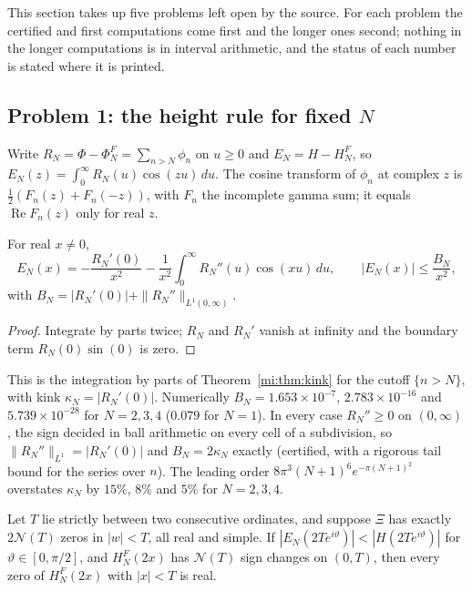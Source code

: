 This section takes up five problems left open by the source. For each problem the certified and first computations come first and the longer ones second; nothing in the longer computations is in interval arithmetic, and the status of each number is stated where it is printed.

\subsection{Problem 1: the height rule for fixed \texorpdfstring{$N$}{N}}

Write $R_N=\Phi-\Phi^F_N=\sum_{n>N}\phi_n$ on $u\ge0$ and $E_N=H-H^F_N$, so $E_N(z)=\int_0^\infty R_N(u)\cos(zu)\,du$. The cosine transform of $\phi_n$ at complex $z$ is $\tfrac12(F_n(z)+F_n(-z))$, with $F_n$ the incomplete gamma sum; it equals $\operatorname{Re}F_n(z)$ only for real $z$.

\begin{lemma}\label{ev:lem:kink}
For real $x\ne0$,
\[
E_N(x)=-\frac{R_N'(0)}{x^2}-\frac1{x^2}\int_0^\infty R_N''(u)\cos(xu)\,du,\qquad |E_N(x)|\le\frac{B_N}{x^2},
\]
with $B_N=|R_N'(0)|+\|R_N''\|_{L^1(0,\infty)}$.
\end{lemma}

\begin{proof}
Integrate by parts twice; $R_N$ and $R_N'$ vanish at infinity and the boundary term $R_N(0)\sin(0)$ is zero.
\end{proof}

This is the integration by parts of Theorem~\ref{mi:thm:kink} for the cutoff $\{n>N\}$, with kink $\kappa_N=|R_N'(0)|$. Numerically $B_N=1.653\times10^{-7}$, $2.783\times10^{-16}$ and $5.739\times10^{-28}$ for $N=2,3,4$ ($0.079$ for $N=1$). In every case $R_N''\ge0$ on $(0,\infty)$, the sign decided in ball arithmetic on every cell of a subdivision, so $\|R_N''\|_{L^1}=|R_N'(0)|$ and $B_N=2\kappa_N$ exactly (certified, with a rigorous tail bound for the series over $n$). The leading order $8\pi^3(N+1)^6e^{-\pi(N+1)^2}$ overstates $\kappa_N$ by $15\%$, $8\%$ and $5\%$ for $N=2,3,4$.

\begin{proposition}\label{ev:prop:rouche}
Let $T$ lie strictly between two consecutive ordinates, and suppose $\Xi$ has exactly $2\mathcal N(T)$ zeros in $|w|<T$, all real and simple. If $|E_N(2Te^{i\vartheta})|<|H(2Te^{i\vartheta})|$ for $\vartheta\in[0,\pi/2]$, and $H^F_N(2x)$ has $\mathcal N(T)$ sign changes on $(0,T)$, then every zero of $H^F_N(2x)$ with $|x|<T$ is real.
\end{proposition}

